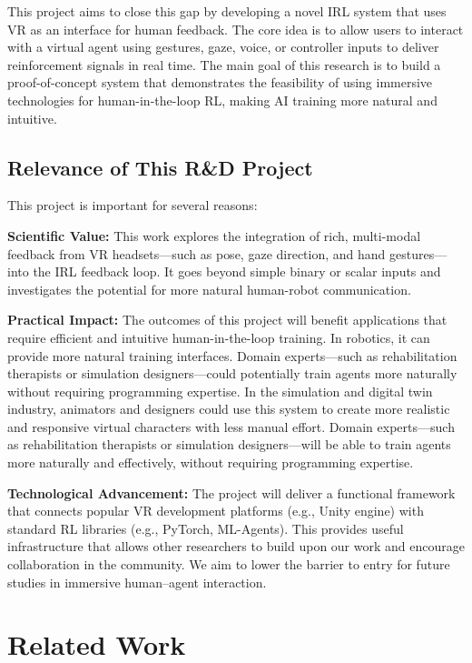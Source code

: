 \documentclass[rnd]{mas_proposal}
\begin{document}
This project aims to close this gap by developing a novel IRL system that uses VR as an interface for human feedback. The core idea is to allow users to interact with a virtual agent using gestures, gaze, voice, or controller inputs to deliver reinforcement signals in real time. The main goal of this research is to build a proof-of-concept system that demonstrates the feasibility of using immersive technologies for human-in-the-loop RL, making AI training more natural and intuitive.

\subsection{Relevance of This R\&D Project}
This project is important for several reasons:

\textbf{Scientific Value:} This work explores the integration of rich, multi-modal feedback from VR headsets—such as pose, gaze direction, and hand gestures—into the IRL feedback loop. It goes beyond simple binary or scalar inputs \citep{Faulkner2020, Loftin2014} and investigates the potential for more natural human-robot communication.

\textbf{Practical Impact:} The outcomes of this project will benefit applications that require efficient and intuitive human-in-the-loop training. In robotics, it can provide more natural training interfaces. Domain experts—such as rehabilitation therapists or simulation designers—could potentially train agents more naturally without requiring programming expertise. In the simulation and digital twin industry, animators and designers could use this system to create more realistic and responsive virtual characters \citep{Winkler2022, Luo2024} with less manual effort. Domain experts—such as rehabilitation therapists or simulation designers—will be able to train agents more naturally and effectively, without requiring programming expertise.

\textbf{Technological Advancement:} The project will deliver a functional framework that connects popular VR development platforms (e.g., Unity engine) with standard RL libraries (e.g., PyTorch, ML-Agents). This provides useful infrastructure that allows other researchers to build upon our work and encourage collaboration in the community. We aim to lower the barrier to entry for future studies in immersive human–agent interaction.


\section{Related Work}
\end{document}

